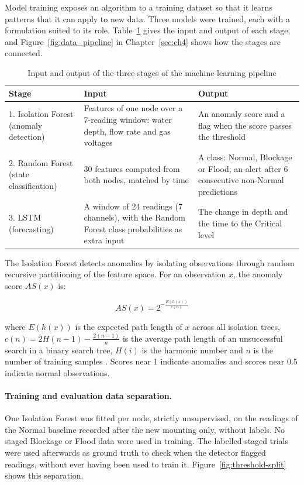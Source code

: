 \documentclass[12pt, a4paper]{article}
\newcommand{\myequations}[1]{%
\addcontentsline{equ}{myequations}{\protect\numberline{\theequation}#1}\par}
\begin{document}
Model training exposes an algorithm to a training dataset so that it learns patterns that it can apply to new data. Three models were trained, each with a formulation suited to its role. Table~\ref{tab:pipeline-dataflow} gives the input and output of each stage, and Figure~\ref{fig:data_pipeline} in Chapter~\ref{sec:ch4} shows how the stages are connected.

\begin{table}[H]
\centering
\begin{tabular}{|p{3.2cm}|p{6.0cm}|p{5.2cm}|}
\hline
\textbf{Stage} & \textbf{Input} & \textbf{Output} \\
\hline
1. Isolation Forest (anomaly detection) & Features of one node over a 7-reading window: water depth, flow rate and gas voltages & An anomaly score and a flag when the score passes the threshold \\
\hline
2. Random Forest (state classification) & 30 features computed from both nodes, matched by time & A class: Normal, Blockage or Flood; an alert after 6 consecutive non-Normal predictions \\
\hline
3. LSTM (forecasting) & A window of 24 readings (7 channels), with the Random Forest class probabilities as extra input & The change in depth and the time to the Critical level \\
\hline
\end{tabular}
\caption{Input and output of the three stages of the machine-learning pipeline}
\label{tab:pipeline-dataflow}
\end{table}

The Isolation Forest detects anomalies by isolating observations through random recursive partitioning of the feature space. For an observation $x$, the anomaly score $AS(x)$ is:

\begin{equation}
AS(x) = 2^{-\frac{E(h(x))}{c(n)}}
\end{equation}
\myequations{Isolation Forest Anomaly Score}

where $E(h(x))$ is the expected path length of $x$ across all isolation trees, $c(n) = 2H(n-1) - \frac{2(n-1)}{n}$ is the average path length of an unsuccessful search in a binary search tree, $H(i)$ is the harmonic number and $n$ is the number of training samples \citep{salim2024}. Scores near 1 indicate anomalies and scores near 0.5 indicate normal observations.

\paragraph{Training and evaluation data separation.}
One Isolation Forest was fitted per node, strictly unsupervised, on the readings of the Normal baseline recorded after the new mounting only, without labels. No staged Blockage or Flood data were used in training. The labelled staged trials were used afterwards as ground truth to check when the detector flagged readings, without ever having been used to train it. Figure~\ref{fig:threshold-split} shows this separation.
\end{document}

